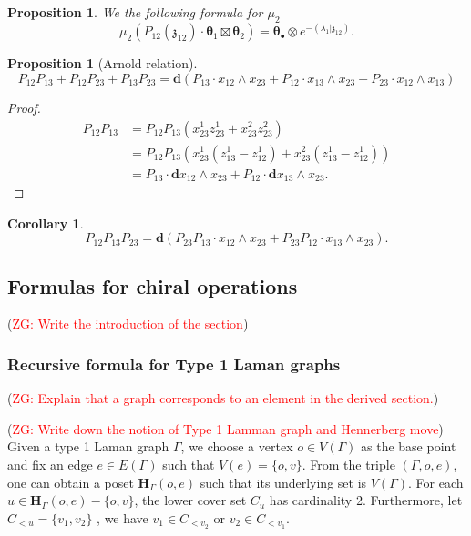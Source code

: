 \documentclass[11pt]{amsart}
\newtheorem{cor}[thm]{Corollary}
\newtheorem{prop}[thm]{Proposition}
\theoremstyle{definition}
\theoremstyle{remark}
\numberwithin{equation}{section}
\newcommand{\Gui}[1]{(\textcolor{red}{ZG: #1})}
\begin{document}
\begin{prop}
We the following formula for $\mu_2$
$$
\mu_2\left(P_{12}(\mathfrak{z}_{12})\cdot  \boldsymbol{\theta}_1\boxtimes  \boldsymbol{\theta}_2\right)=\boldsymbol{\theta}_{\bullet}\otimes e^{-(\lambda_1|\mathfrak{z}_{12})}.
$$
\end{prop}

\begin{prop}[Arnold relation]
  $$
  P_{12}P_{13}+P_{12}P_{23}+P_{13}P_{23}=\mathbf{d}\left(P_{13}\cdot x_{12}\wedge x_{23}+P_{12}\cdot x_{13}\wedge x_{23}+P_{23}\cdot x_{12}\wedge x_{13}\right)
  $$
\end{prop}
\begin{proof}

  \begin{align*}
   P_{12}P_{13}  &=P_{12}P_{13}(x^1_{23}z^1_{23}+x^2_{23}z^2_{23})  \\
     & =P_{12}P_{13}\left(x^1_{23}(z^1_{13}-z^1_{12})+x^2_{23}(z^1_{13}-z^1_{12})\right)\\
     &=P_{13}\cdot \mathbf{d}x_{12}\wedge x_{23}+P_{12}\cdot \mathbf{d}x_{13}\wedge x_{23}.
  \end{align*}
\end{proof}
\begin{cor}\label{RecursiveLemma}
  $$
  P_{12}P_{13}P_{23}=\mathbf{d}\left(P_{23}P_{13}\cdot x_{12}\wedge x_{23}+P_{23}P_{12}\cdot x_{13}\wedge x_{23}\right).
  $$
\end{cor}
\subsection{Formulas for chiral operations}
\Gui{Write the introduction of the section}
\subsubsection{Recursive formula for Type 1 Laman graphs}
\Gui{Explain that a graph corresponds to an element in the derived section.}

\Gui{Write down the notion of Type 1 Lamman graph and Hennerberg move}
Given a type 1 Laman graph $\Gamma$, we choose a vertex $o\in V(\Gamma)$ as the base point and fix an edge $e\in E(\Gamma)$ such that $V(e)=\{o,v\}$. From the triple $(\Gamma,o,e)$, one can obtain a poset $\mathbf{H}_{\Gamma}(o,e)$ such that its underlying set is $V(\Gamma)$. For each $u\in \mathbf{H}_{\Gamma}(o,e)-\{o,v\}$, the lower cover set $C_u$ has cardinality 2. Furthermore, let $C_{<u}=\{v_1,v_2\}$ , we have $v_1\in C_{<v_2}$ or $v_2\in C_{<v_1}$.
\end{document}

